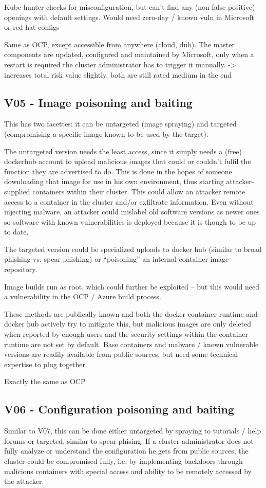 Kube-hunter checks for misconfiguration, but can’t find any (non-false-positive) openings with default settings. Would need zero-day / known vuln in Microsoft or red hat configs

Same as OCP, except accessible from anywhere (cloud, duh).
The master components are updated, configured and maintained by Microsoft, only when a restart is required the cluster administrator has to trigger it manually.
-> increases total risk value slightly, both are still rated medium in the end

\subsection{V05 - Image poisoning and baiting}
This has two facettes: it can be untargeted (image spraying) and targeted (compromising a specific image known to be used by the target).

The untargeted version needs the least access, since it simply needs a (free) dockerhub account to upload malicious images that could or couldn’t fulfil the function they are advertised to do. This is done in the hopes of someone downloading that image for use in his own environment, thus starting attacker-supplied containers within their cluster.
This could allow an attacker remote access to a container in the cluster and/or exfiltrate information.
Even without injecting malware, an attacker could mislabel old software versions as newer ones so software with known vulnerabilities is deployed because it is though to be up to date.

The targeted version could be specialized uploads to docker hub (similar to broad phishing vs. spear phishing) or “poisoning” an internal container image repository.

Image builds run as root, which could further be exploited – but this would need a vulnerability in the OCP / Azure build process.

These methods are publically known and both the docker container runtime and docker hub actively try to mitigate this, but malicious images are only deleted when reported by enough users and the security settings within the container runtime are not set by default.
Base containers and malware / known vulnerable versions are readily available from public sources, but need some technical expertise to plug together.

Exactly the same as OCP

\subsection{V06 - Configuration poisoning and baiting}
Similar to V07, this can be done either untargeted by spraying to tutorials / help forums or targeted, similar to spear phising.
If a cluster administrator does not fully analyze or understand the configuration he gets from public sources, the cluster could be compromised fully, i.e. by implementing backdoors through malicious containers with special access and ability to be remotely accessed by the attacker.

